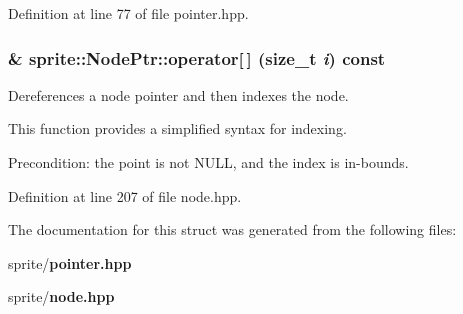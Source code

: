 Definition at line 77 of file pointer.hpp.
\subsubsection{ \& sprite::Node\-Ptr::operator[$\,$] (size\_\-t {\em i}) const\hspace{0.3cm}{\tt  [inline]}}\label{structsprite_1_1NodePtr_a6}


Dereferences a node pointer and then indexes the node. 

This function provides a simplified syntax for indexing.

Precondition: the point is not NULL, and the index is in-bounds. 

Definition at line 207 of file node.hpp.

The documentation for this struct was generated from the following files:\begin{CompactItemize}
\item 
sprite/{\bf pointer.hpp}\item 
sprite/{\bf node.hpp}\end{CompactItemize}

